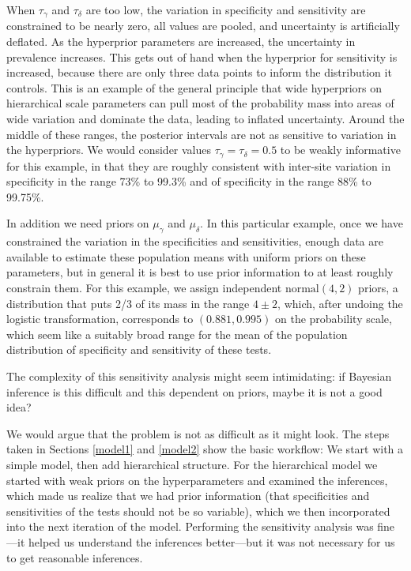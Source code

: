 \documentclass[11pt]{article}
\begin{document}
When $\tau_{\gamma}$ and $\tau_{\delta}$ are too low, the variation in
specificity and sensitivity are constrained to be nearly zero, all
values are pooled, and uncertainty is artificially deflated. As the
hyperprior parameters are increased, the uncertainty in prevalence
increases. This gets out of hand when the hyperprior for sensitivity
is increased, because there are only three data points to inform the
distribution it controls. This is an example of the general principle
that wide hyperpriors on hierarchical scale parameters can pull most
of the probability mass into areas of wide variation and dominate the
data, leading to inflated uncertainty.  Around the middle of these
ranges, the posterior intervals are not as sensitive to variation in
the hyperpriors. We would consider values
$\tau_{\gamma}=\tau_{\delta}=0.5$ to be weakly informative for this
example, in that they are roughly consistent with inter-site variation
in specificity in the range 73\% to 99.3\% and of specificity in the
range 88\% to 99.75\%.

In addition we need priors on $\mu_{\gamma}$ and $\mu_{\delta}$.  In
this particular example, once we have constrained the variation in the
specificities and sensitivities, enough data are available to estimate
these population means with uniform priors on these parameters, but in
general it is best to use prior information to at least roughly
constrain them.  For this example, we assign independent
$\mbox{normal}(4,2)$ priors, a distribution that puts 2/3 of its mass
in the range $4\pm 2$, which, after undoing the logistic
transformation, corresponds to $(0.881, 0.995)$ on the probability
scale, which seem like a suitably broad range for the mean of the
population distribution of specificity and sensitivity of these tests.

The complexity of this sensitivity analysis might seem intimidating:
if Bayesian inference is this difficult and this dependent on priors,
maybe it is not a good idea?

We would argue that the problem is not as difficult as it might look.
The steps taken in Sections \ref{model1} and \ref{model2} show the
basic workflow: We start with a simple model, then add hierarchical
structure.  For the hierarchical model we started with weak priors on
the hyperparameters and examined the inferences, which made us realize
that we had prior information (that specificities and sensitivities of
the tests should not be so variable), which we then incorporated into
the next iteration of the model.  Performing the sensitivity analysis
was fine---it helped us understand the inferences better---but it was
not necessary for us to get reasonable inferences.
\end{document}
